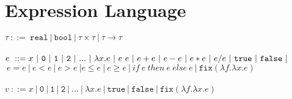 \documentclass{westhesis}
\begin{document}
\section{Expression Language}
$\tau \ ::= \ \texttt{real} \ | \ \texttt{bool} \ | \ \tau \times \tau \ | \ \tau \rightarrow \tau$ \\ \\
 $e \ ::= x  \ | \ \texttt{0} \ | \ \texttt{1} \ | \ \texttt{2} \ | \ ... \ | \ \lambda x.e \ | \ e \ e \ | \ e + e \ | \ e - e \ | \  e  *  e \ | \ e / e \ | \ \texttt{true} \ | \ \texttt{false} \ | \\$\-\hspace{.8cm}$\ e  =  e \ | \ e < e \ | \ e > e \ | e \leq e \ | \ e \geq e \ | 
 \ if \ e \ then \ e \ else \ e \ | \ \texttt{fix} (\lambda f.\lambda x.e)$ \\ \\
 $v \ ::= x  \ | \ \texttt{0} \ | \ \texttt{1} \ | \ \texttt{2} \ | \ ... \ | \ \lambda x.e \ | \ \texttt{true} \ |  \ \texttt{false} \ 
 | \ \texttt{fix} (\lambda f.\lambda x.e)$
\end{document}
